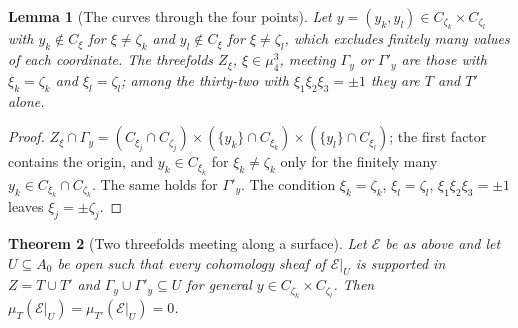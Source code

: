 \documentclass[11pt,reqno]{amsart}
\numberwithin{equation}{section}
\theoremstyle{plain}
\newtheorem{theorem}{Theorem}[section]
\newtheorem{lemma}[theorem]{Lemma}
\theoremstyle{definition}
\begin{document}
\begin{lemma}[The curves through the four points]\label{lem:curvesT}
Let $y=(y_{k},y_{l})\in C_{\zeta_{k}}\times C_{\zeta_{l}}$ with $y_{k}\notin C_{\xi}$ for $\xi\ne\zeta_{k}$ and $y_{l}\notin C_{\xi}$ for $\xi\ne\zeta_{l}$, which excludes finitely many values of each coordinate. The threefolds $Z_{\xi}$, $\xi\in\mu_{4}^{3}$, meeting $\Gamma_{y}$ or $\Gamma'_{y}$ are those with $\xi_{k}=\zeta_{k}$ and $\xi_{l}=\zeta_{l}$; among the thirty-two with $\xi_{1}\xi_{2}\xi_{3}=\pm1$ they are $T$ and $T'$ alone.
\end{lemma}

\begin{proof}
$Z_{\xi}\cap\Gamma_{y}=(C_{\xi_{j}}\cap C_{\zeta_{j}})\times(\{y_{k}\}\cap C_{\xi_{k}})\times(\{y_{l}\}\cap C_{\xi_{l}})$; the first factor contains the origin, and $y_{k}\in C_{\xi_{k}}$ for $\xi_{k}\ne\zeta_{k}$ only for the finitely many $y_{k}\in C_{\xi_{k}}\cap C_{\zeta_{k}}$. The same holds for $\Gamma'_{y}$. The condition $\xi_{k}=\zeta_{k}$, $\xi_{l}=\zeta_{l}$, $\xi_{1}\xi_{2}\xi_{3}=\pm1$ leaves $\xi_{j}=\pm\zeta_{j}$.
\end{proof}

\begin{theorem}[Two threefolds meeting along a surface]\label{thm:pair}
Let $\mathcal{E}$ be as above and let $U\subseteq A_{0}$ be open such that every cohomology sheaf of $\mathcal{E}|_{U}$ is supported in $Z=T\cup T'$ and $\Gamma_{y}\cup\Gamma'_{y}\subseteq U$ for general $y\in C_{\zeta_{k}}\times C_{\zeta_{l}}$. Then $\mu_{T}(\mathcal{E}|_{U})=\mu_{T'}(\mathcal{E}|_{U})=0$.
\end{theorem}
\end{document}
